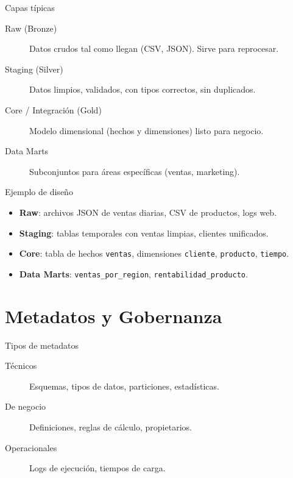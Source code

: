 \documentclass[aspectratio=169, 10pt, xcolor=table]{beamer}
\begin{document}
\begin{frame}{Capas típicas}
    \begin{description}
        \item[Raw (Bronze)] Datos crudos tal como llegan (CSV, JSON). Sirve para reprocesar.
        \item[Staging (Silver)] Datos limpios, validados, con tipos correctos, sin duplicados.
        \item[Core / Integración (Gold)] Modelo dimensional (hechos y dimensiones) listo para negocio.
        \item[Data Marts] Subconjuntos para áreas específicas (ventas, marketing).
    \end{description}
\end{frame}

\begin{frame}{Ejemplo de diseño}
    \begin{itemize}
        \item \textbf{Raw}: archivos JSON de ventas diarias, CSV de productos, logs web.
        \item \textbf{Staging}: tablas temporales con ventas limpias, clientes unificados.
        \item \textbf{Core}: tabla de hechos \texttt{ventas}, dimensiones \texttt{cliente}, \texttt{producto}, \texttt{tiempo}.
        \item \textbf{Data Marts}: \texttt{ventas\_por\_region}, \texttt{rentabilidad\_producto}.
    \end{itemize}
\end{frame}

\section{Metadatos y Gobernanza}

\begin{frame}{Tipos de metadatos}
    \begin{description}
        \item[Técnicos] Esquemas, tipos de datos, particiones, estadísticas.
        \item[De negocio] Definiciones, reglas de cálculo, propietarios.
        \item[Operacionales] Logs de ejecución, tiempos de carga.
    \end{description}
\end{frame}
\end{document}
